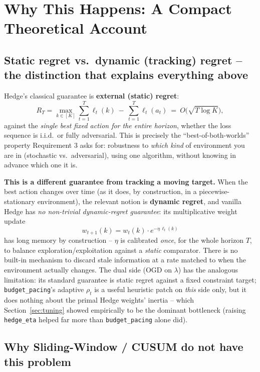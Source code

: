 \documentclass[11pt,a4paper]{article}
\newcommand{\1}{\mathbf{1}}
\begin{document}
\section{Why This Happens: A Compact Theoretical Account}
\label{sec:theory}

\subsection{Static regret vs.\ dynamic (tracking) regret -- the distinction that explains everything above}

Hedge's classical guarantee is \textbf{external (static) regret}:
\[
  R_T = \max_{k\in[K]} \sum_{t=1}^T \ell_t(k) \ -\ \sum_{t=1}^T \ell_t(a_t) \ =\ O\big(\sqrt{T\log K}\big),
\]
against the \emph{single best fixed action for the entire horizon}, whether the loss sequence is i.i.d.\ or fully adversarial. This is precisely the ``best-of-both-worlds'' property Requirement 3 asks for: robustness to \emph{which kind} of environment you are in (stochastic vs.\ adversarial), using one algorithm, without knowing in advance which one it is.

\textbf{This is a different guarantee from tracking a moving target.} When the best action changes over time (as it does, by construction, in a piecewise-stationary environment), the relevant notion is \textbf{dynamic regret}, and vanilla Hedge has \emph{no non-trivial dynamic-regret guarantee}: its multiplicative weight update
\[
  w_{t+1}(k) = w_t(k)\cdot e^{-\eta\, \ell_t(k)}
\]
has long memory by construction -- $\eta$ is calibrated \emph{once}, for the whole horizon $T$, to balance exploration/exploitation against a \emph{static} comparator. There is no built-in mechanism to discard stale information at a rate matched to when the environment actually changes. The dual side (OGD on $\lambda$) has the analogous limitation: its standard guarantee is static regret against a fixed constraint target; \texttt{budget\_pacing}'s adaptive $\rho_t$ is a useful heuristic patch on \emph{this} side only, but it does nothing about the primal Hedge weights' inertia -- which Section~\ref{sec:tuning} showed empirically to be the dominant bottleneck (raising \texttt{hedge\_eta} helped far more than \texttt{budget\_pacing} alone did).

\subsection{Why Sliding-Window / CUSUM do not have this problem}
\end{document}
